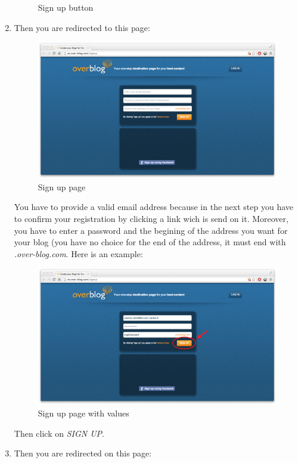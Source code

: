\documentclass[a4paper,10pt]{article}
\begin{document}
\begin{enumerate}
\begin{figure}[H]
    \caption{Sign up button}
\end{figure}
\item Then you are redirected to this page:
\begin{figure}[H]
    \center
	\includegraphics[width=13cm]{Images/signUpPage.png}
    \caption{Sign up page}
\end{figure}
You have to provide a valid email address because in the next step you have to confirm your registration by clicking a link wich is send on it. Moreover, you have to enter a password and the begining of the address you want for your blog (you have no choice for the end of the address, it must end with \emph{.over-blog.com}. Here is an example:
\begin{figure}[H]
    \center
	\includegraphics[width=13cm]{Images/signUpPageValues.png}
    \caption{Sign up page with values}
\end{figure}
Then click on \emph{SIGN UP}.
\item Then you are redirected on this page:
\begin{figure}[H]
    \center

\end{figure}
\end{enumerate}
\end{document}
